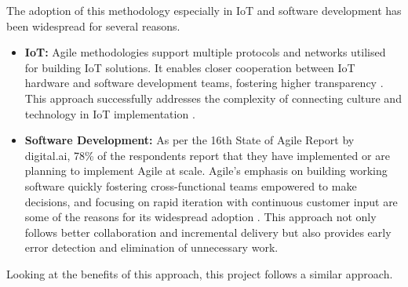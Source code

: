 The adoption of this methodology especially in IoT and software development has been widespread for several reasons. 
\begin{itemize}
    \item \textbf{IoT:} Agile methodologies support multiple protocols and networks utilised for building IoT solutions. It enables closer cooperation between IoT hardware and software development teams, fostering higher transparency \cite{30}. This approach successfully addresses the complexity of connecting culture and technology in IoT implementation \cite{34}.
    \item \textbf{Software Development:} As per the 16th State of Agile Report by digital.ai, 78\% of the respondents report that they have implemented or are planning to implement Agile at scale. Agile’s emphasis on building working software quickly fostering cross-functional teams empowered to make decisions, and focusing on rapid iteration with continuous customer input are some of the reasons for its widespread adoption \cite{35}.  This approach not only follows better collaboration and incremental delivery but also provides early error detection and elimination of unnecessary work. 
\end{itemize}



\noindent Looking at the benefits of this approach, this project follows a similar approach. 
